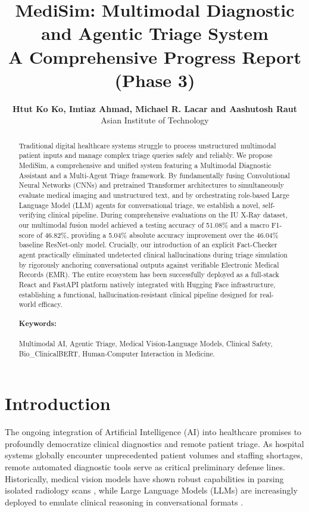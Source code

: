 \documentclass[11pt,a4paper]{article}
\title{MediSim: Multimodal Diagnostic and Agentic Triage System\\
A Comprehensive Progress Report (Phase 3)}
\author{
  \textbf{Htut Ko Ko, Imtiaz Ahmad, Michael R. Lacar and Aashutosh Raut} \\
  Asian Institute of Technology
}
\begin{document}
\maketitle
\thispagestyle{plain}
\pagestyle{plain}

\begin{abstract}
Traditional digital healthcare systems struggle to process unstructured multimodal patient inputs and manage complex triage queries safely and reliably. We propose MediSim, a comprehensive and unified system featuring a Multimodal Diagnostic Assistant and a Multi-Agent Triage framework. By fundamentally fusing Convolutional Neural Networks (CNNs) and pretrained Transformer architectures to simultaneously evaluate medical imaging and unstructured text, and by orchestrating role-based Large Language Model (LLM) agents for conversational triage, we establish a novel, self-verifying clinical pipeline. During comprehensive evaluations on the IU X-Ray dataset, our multimodal fusion model achieved a testing accuracy of 51.08\% and a macro F1-score of 46.82\%, providing a 5.04\% absolute accuracy improvement over the 46.04\% baseline ResNet-only model. Crucially, our introduction of an explicit Fact-Checker agent practically eliminated undetected clinical hallucinations during triage simulation by rigorously anchoring conversational outputs against verifiable Electronic Medical Records (EMR). The entire ecosystem has been successfully deployed as a full-stack React and FastAPI platform natively integrated with Hugging Face infrastructure, establishing a functional, hallucination-resistant clinical pipeline designed for real-world efficacy.

\paragraph{Keywords:} Multimodal AI, Agentic Triage, Medical Vision-Language Models, Clinical Safety, Bio\_ClinicalBERT, Human-Computer Interaction in Medicine.
\end{abstract}

\section{Introduction}

The ongoing integration of Artificial Intelligence (AI) into healthcare promises to profoundly democratize clinical diagnostics and remote patient triage. As hospital systems globally encounter unprecedented patient volumes and staffing shortages, remote automated diagnostic tools serve as critical preliminary defense lines. Historically, medical vision models have shown robust capabilities in parsing isolated radiology scans \citep{bu2024dynamic}, while Large Language Models (LLMs) are increasingly deployed to emulate clinical reasoning in conversational formats \citep{lu2024triageagent}. 
\end{document}
